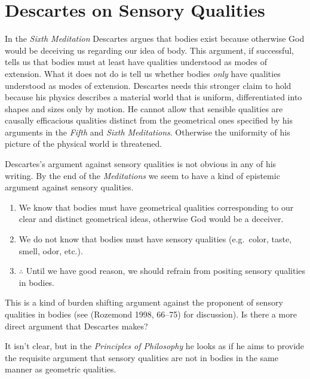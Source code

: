 \documentclass[12pt]{article}
\makeatletter
\newcommand{\citeprocitem}[2]{\hyper@linkstart{cite}{citeproc_bib_item_#1}#2\hyper@linkend}
\makeatother
\begin{document}
\section{Descartes on Sensory Qualities}
\label{sec:orgf223981}
In the \emph{Sixth Meditation} Descartes argues that bodies exist because
otherwise God would be deceiving us regarding our idea of body. This
argument, if successful, tells us that bodies must at least have
qualities understood as modes of extension. What it does not do is tell
us whether bodies \emph{only} have qualities understood as modes of
extension. Descartes needs this stronger claim to hold because his
physics describes a material world that is uniform, differentiated into
shapes and sizes only by motion. He cannot allow that sensible qualities
are causally efficacious qualities distinct from the geometrical ones
specified by his arguments in the \emph{Fifth} and \emph{Sixth Meditations}.
Otherwise the uniformity of his picture of the physical world is
threatened.

Descartes's argument against sensory qualities is not obvious in any of
his writing. By the end of the \emph{Meditations} we seem to have a kind of
epistemic argument against sensory qualities.

\begin{enumerate}
\item We know that bodies must have geometrical qualities corresponding to
our clear and distinct geometrical ideas, otherwise God would be a
deceiver.
\item We do not know that bodies must have sensory qualities (e.g. color,
taste, smell, odor, etc.).
\item \(\therefore\) Until we have good reason, we should refrain from positing sensory
qualities in bodies.
\end{enumerate}

This is a kind of burden shifting argument against the proponent of
sensory qualities in bodies (see (\citeprocitem{7}{Rozemond 1998, 66–75}) for discussion).
Is there a more direct argument that Descartes makes?

It isn't clear, but in the \emph{Principles of Philosophy} he looks as if he
aims to provide the requisite argument that sensory qualities are not in
bodies in the same manner as geometric qualities.
\end{document}
